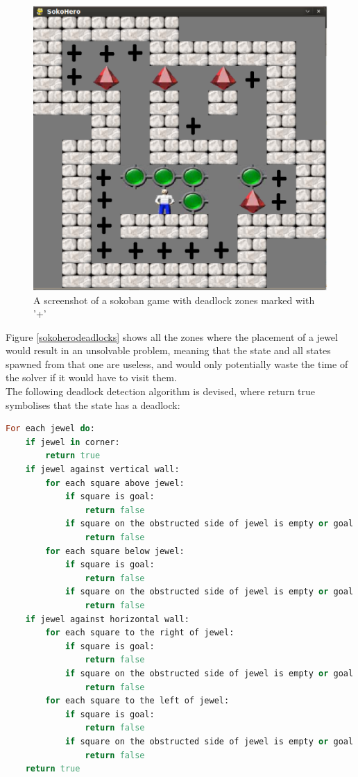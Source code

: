 \begin{figure}[ht]
\centering
\includegraphics[scale=0.25]{images/sokohero_deadlocks.eps}
\caption{A screenshot of a sokoban game with deadlock zones marked with '+'}
\label{fig:sokoherodeadlocks}
\end{figure}

Figure \ref{sokoherodeadlocks} shows all the zones where the placement of a jewel would result in an unsolvable problem, meaning that the state and all states spawned from that one are useless, and would only potentially waste the time of the solver if it would have to visit them.
\\
The following deadlock detection algorithm is devised, where return true symbolises that the state has a deadlock:

\begin{lstlisting}[language=Ruby, frame=single, basicstyle=\small, caption={Deadlock detection pseudo code}, label={code:deaddetect}]
For each jewel do:
	if jewel in corner:
		return true
	if jewel against vertical wall:
		for each square above jewel:
			if square is goal:
				return false
			if square on the obstructed side of jewel is empty or goal or jewel:
				return false
		for each square below jewel:
			if square is goal:
				return false
			if square on the obstructed side of jewel is empty or goal or jewel:
				return false
	if jewel against horizontal wall:
		for each square to the right of jewel:
			if square is goal:
				return false
			if square on the obstructed side of jewel is empty or goal or jewel:
				return false
		for each square to the left of jewel:
			if square is goal:
				return false
			if square on the obstructed side of jewel is empty or goal or jewel:
				return false
	return true
\end{lstlisting}

